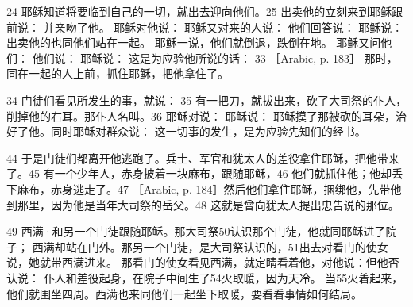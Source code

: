 24  耶稣知道将要临到自己的一切，就出去迎向他们。25 出卖他的立刻来到耶稣跟前说： 并亲吻了他。 耶稣对他说： 耶稣又对来的人说： 他们回答说： 耶稣说： 出卖他的也同他们站在一起。 耶稣一说，他们就倒退，跌倒在地。 耶稣又问他们： 他们说：  耶稣说：  这是为应验他所说的话： 33 ［Arabic, p. 183］ 那时，同在一起的人上前，抓住耶稣，把他拿住了。\par

34  门徒们看见所发生的事，就说： 35   有一把刀，就拔出来，砍了大司祭的仆人，削掉他的右耳。那仆人名叫。36  耶稣对说：  耶稣说：  耶稣摸了那被砍的耳朵，治好了他。同时耶稣对群众说：  这一切事的发生，是为应验先知们的经书。\par

44  于是门徒们都离开他逃跑了。兵士、军官和犹太人的差役拿住耶稣，把他带来了。45  有一个少年人，赤身披着一块麻布，跟随耶稣，46  他们就抓住他；他却丢下麻布，赤身逃走了。47 ［Arabic, p. 184］然后他们拿住耶稣，捆绑他，先带他到那里，因为他是当年大司祭的岳父。48  这就是曾向犹太人提出忠告说的那位。\par

49  西满·和另一个门徒跟随耶稣。那大司祭50认识那个门徒，他就同耶稣进了院子； 西满却站在门外。那另一个门徒，是大司祭认识的，51出去对看门的使女说，她就带西满进来。 那看门的使女看见西满，就定睛看着他，对他说：但他否认说： 仆人和差役起身，在院子中间生了54火取暖，因为天冷。 当55火着起来，他们就围坐四周。西满也来同他们一起坐下取暖，要看看事情如何结局。\par

